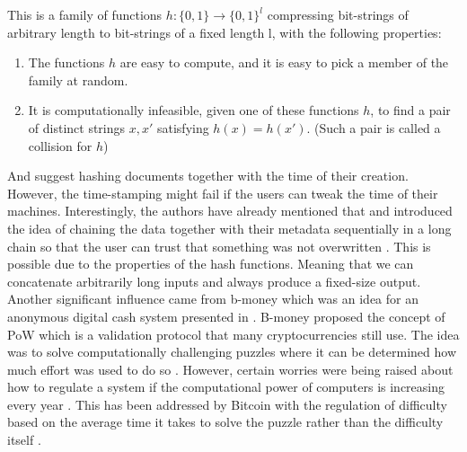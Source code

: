 \begin{defin}[Hash]\label{de:hash}
    This is a family of functions $h: \{0,1\} \rightarrow  {\{0, 1\}}^l $ compressing
bit-strings of arbitrary length to bit-strings of a fixed length l, with the following
properties:
\begin{enumerate}
    \item The functions $h$ are easy to compute, and it is easy to pick a member of the family at random.
    \item It is computationally infeasible, given one of these functions $h$, to find a pair
of distinct strings $x,x'$ satisfying $h(x)=h(x')$. (Such a pair is called a collision for $h$)\cite[see Chapter 4.1]{Haber1991}
\end{enumerate}
\end{defin}

And suggest hashing documents together with the time of their creation.
However, the time-stamping might 
fail if the users can tweak the time of their machines. Interestingly, the authors have already 
mentioned that and introduced the idea of chaining the data together with their metadata sequentially in a long chain 
so that the user can trust that something was not overwritten \cite[see Chapter 5]{Haber1991}. 
This is possible due to the properties of the hash functions.
Meaning that we can concatenate arbitrarily long inputs and always produce a fixed-size output. 
Another significant influence came from b-money which was an idea for an anonymous digital
cash system presented in \cite{Dai1998}. B-money proposed the concept of \ac{PoW}
which is a validation protocol that many cryptocurrencies still use. The idea was to solve
computationally challenging puzzles where it can be determined how much effort was used to do so
\cite[see][pg.~1]{Dai1998}.
However, certain worries were being raised about how to regulate a system if the computational power
of computers is increasing every year \cite[see][pg.~3]{Dai1998}. This has been addressed by Bitcoin
with the regulation of difficulty based on the average time it takes to solve the puzzle 
rather than the difficulty itself \cite[see][pg.~3]{Nakamoto2008}.


